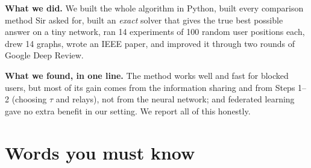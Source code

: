\documentclass[11pt,a4paper]{article}
\begin{document}
\textbf{What we did.} We built the whole algorithm in Python, built every comparison method Sir asked for,
built an \emph{exact} solver that gives the true best possible answer on a tiny network, ran 14 experiments of
100 random user positions each, drew 14 graphs, wrote an IEEE paper, and improved it through two rounds of
Google Deep Review.

\textbf{What we found, in one line.} The method works well and fast for blocked users, but most of its gain
comes from the information sharing and from Steps 1--2 (choosing $\tau$ and relays), not from the neural
network; and federated learning gave no extra benefit in our setting. We report all of this honestly.

\section{Words you must know}
\end{document}
